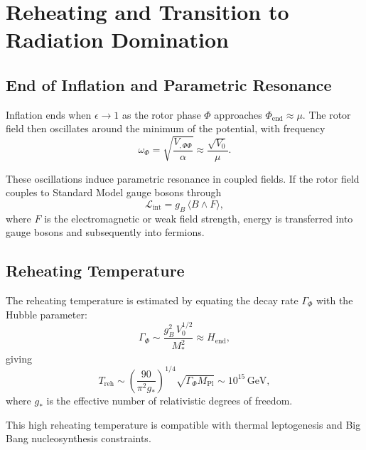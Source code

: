 \documentclass[11pt,a4paper]{article}
\numberwithin{equation}{section}
\theoremstyle{plain}
\theoremstyle{definition}
\theoremstyle{remark}
\begin{document}
\section{Reheating and Transition to Radiation Domination}
\label{sec:reheat}

\subsection{End of Inflation and Parametric Resonance}

Inflation ends when $\epsilon \to 1$ as the rotor phase $\Phi$ approaches $\Phi_{\mathrm{end}} \approx \mu$. The rotor field then oscillates around the minimum of the potential, with frequency
\begin{equation}
\omega_{\Phi} = \sqrt{\frac{V_{,\Phi\Phi}}{\alpha}} \approx \frac{\sqrt{V_0}}{\mu}.
\end{equation}

These oscillations induce parametric resonance in coupled fields. If the rotor field couples to Standard Model gauge bosons through
\begin{equation}
\mathcal{L}_{\mathrm{int}} = g_B\,\langle B \wedge F \rangle,
\label{eq:coupling}
\end{equation}
where $F$ is the electromagnetic or weak field strength, energy is transferred into gauge bosons and subsequently into fermions.

\subsection{Reheating Temperature}

The reheating temperature is estimated by equating the decay rate $\Gamma_{\Phi}$ with the Hubble parameter:
\begin{equation}
\Gamma_{\Phi} \sim \frac{g_B^2\,V_0^{1/2}}{M_*^2} \approx H_{\mathrm{end}},
\end{equation}
giving
\begin{equation}
T_{\mathrm{reh}} \sim \left(\frac{90}{\pi^2 g_*}\right)^{1/4}\sqrt{\Gamma_{\Phi} M_{\mathrm{Pl}}} \sim 10^{15}\,\mathrm{GeV},
\label{eq:reheat-temp}
\end{equation}
where $g_*$ is the effective number of relativistic degrees of freedom.

This high reheating temperature is compatible with thermal leptogenesis and Big Bang nucleosynthesis constraints.
\end{document}
